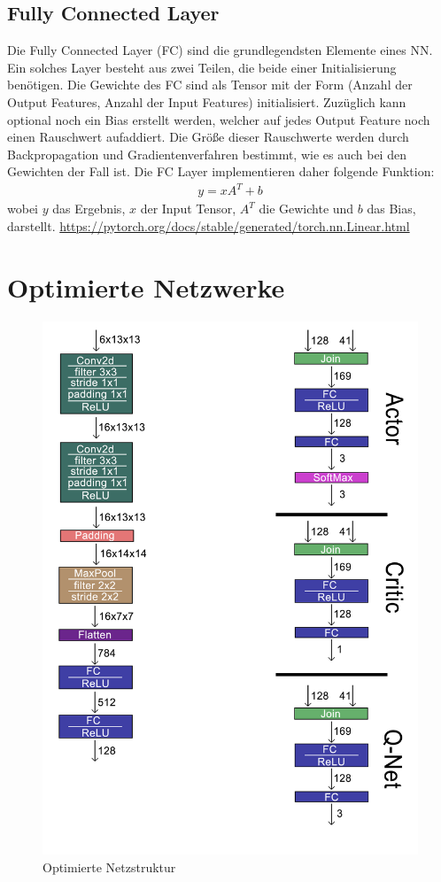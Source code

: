 \subsection{Fully Connected Layer} \label{FC_Layers}
Die Fully Connected Layer (FC) sind die grundlegendsten Elemente eines NN. Ein solches Layer besteht aus zwei Teilen, die beide einer Initialisierung benötigen.
Die Gewichte des FC sind als Tensor mit der Form (Anzahl der Output Features, Anzahl der Input Features) initialisiert. Zuzüglich kann optional noch ein Bias erstellt werden, welcher auf jedes Output Feature noch einen Rauschwert aufaddiert. Die Größe dieser Rauschwerte werden durch Backpropagation und Gradientenverfahren bestimmt, wie es auch bei den Gewichten der Fall ist. Die FC Layer implementieren daher folgende Funktion:
\begin{align}
	y = xA^T + b
\end{align}
wobei $y$ das Ergebnis, $x$ der Input Tensor, $A^T$ die Gewichte und $b$ das Bias, darstellt. \url{https://pytorch.org/docs/stable/generated/torch.nn.Linear.html}

\section{Optimierte Netzwerke}
\begin{figure}[H]
	\centering
	\includegraphics[scale=1.0]{Abbildungen/Anhang/NetzstrukturOptimized.png}
	\caption[Optimierte Netzstruktur]{Optimierte Netzstruktur}
	\label{fig:ConvNetOptimized}
\end{figure}



